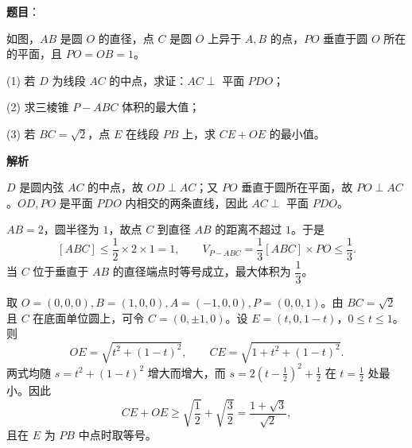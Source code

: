\begin{answer}

\textbf{题目}：

如图，\(AB\) 是圆 \(O\) 的直径，点 \(C\) 是圆 \(O\) 上异于 \(A,B\) 的点，\(PO\) 垂直于圆 \(O\) 所在的平面，且 \(PO=OB=1\)。

(1) 若 \(D\) 为线段 \(AC\) 的中点，求证：\(AC\perp\) 平面 \(PDO\)；

(2) 求三棱锥 \(P-ABC\) 体积的最大值；

(3) 若 \(BC=\sqrt2\)，点 \(E\) 在线段 \(PB\) 上，求 \(CE+OE\) 的最小值。
\nopagebreak[4]
\begin{center}\end{center}
\nopagebreak[4]
\textbf{解析}


\(D\) 是圆内弦 \(AC\) 的中点，故 \(OD\perp AC\)；又 \(PO\) 垂直于圆所在平面，故 \(PO\perp AC\)。\(OD,PO\) 是平面 \(PDO\) 内相交的两条直线，因此 \(AC\perp\) 平面 \(PDO\)。


\(AB=2\)，圆半径为 \(1\)，故点 \(C\) 到直径 \(AB\) 的距离不超过 \(1\)。于是
\nopagebreak[4]
\[
[ABC]\leqslant\frac12\times2\times1=1,\qquad
V_{P-ABC}=\frac13[ABC]\times PO\leqslant\frac13.
\]
当 \(C\) 位于垂直于 \(AB\) 的直径端点时等号成立，最大体积为 \(\dfrac13\)。


取 \(O=(0,0,0), B=(1,0,0), A=(-1,0,0), P=(0,0,1)\)。由 \(BC=\sqrt2\) 且 \(C\) 在底面单位圆上，可令 \(C=(0,\pm1,0)\)。设 \(E=(t,0,1-t)\)，\(0\leqslant t\leqslant1\)。则
\nopagebreak[4]
\[
OE=\sqrt{t^2+(1-t)^2},\qquad CE=\sqrt{1+t^2+(1-t)^2}.
\]
两式均随 \(s=t^2+(1-t)^2\) 增大而增大，而 \(s=2(t-\frac12)^2+\frac12\) 在 \(t=\frac12\) 处最小。因此
\nopagebreak[4]
\[
CE+OE\geqslant\sqrt{\frac12}+\sqrt{\frac32}=\frac{1+\sqrt3}{\sqrt2},
\]
且在 \(E\) 为 \(PB\) 中点时取等号。




\end{answer}
